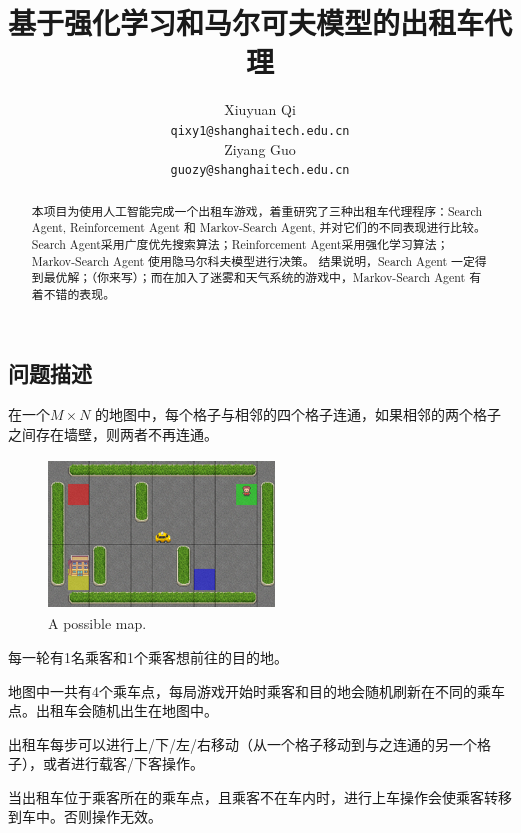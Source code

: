 \documentclass{article}
\title{基于强化学习和马尔可夫模型的出租车代理}
\author{
  Xiuyuan Qi \\
  \texttt{qixy1@shanghaitech.edu.cn} \\
  \And
  Ziyang Guo \\
  \texttt{guozy@shanghaitech.edu.cn} \\
}
\begin{document}
\begin{CJK}{UTF8}{gbsn}


\maketitle


\begin{abstract} 
  本项目为使用人工智能完成一个出租车游戏，着重研究了三种出租车代理程序：Search Agent, Reinforcement Agent 和 Markov-Search Agent, 
  并对它们的不同表现进行比较。
  Search Agent采用广度优先搜索算法；Reinforcement Agent采用强化学习算法；Markov-Search Agent 使用隐马尔科夫模型进行决策。
  结果说明，Search Agent 一定得到最优解；（你来写）；而在加入了迷雾和天气系统的游戏中，Markov-Search Agent 有着不错的表现。
\end{abstract}


\section{问题描述}
在一个$M\times N$ 的地图中，每个格子与相邻的四个格子连通，如果相邻的两个格子之间存在墙壁，则两者不再连通。

\begin{figure}[htbp]
  \centering
  \includegraphics[width=6cm,height=4cm]{images/map.png}
  \caption{A possible map.}
\end{figure}
每一轮有1名乘客和1个乘客想前往的目的地。

​地图中一共有4个乘车点，每局游戏开始时乘客和目的地会随机刷新在不同的乘车点。出租车会随机出生在地图中。 

出租车每步可以进行上/下/左/右移动（从一个格子移动到与之连通的另一个格子），或者进行载客/下客操作。 

当出租车位于乘客所在的乘车点，且乘客不在车内时，进行上车操作会使乘客转移到车中。否则操作无效。 


\end{CJK}
\end{document}
